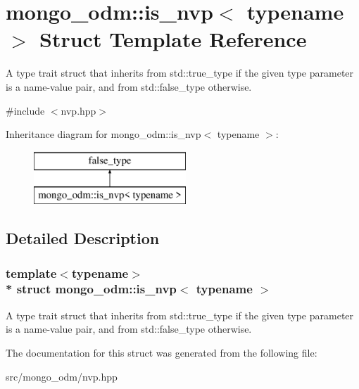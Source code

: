 \hypertarget{structmongo__odm_1_1is__nvp}{}\section{mongo\+\_\+odm\+:\+:is\+\_\+nvp$<$ typename $>$ Struct Template Reference}
\label{structmongo__odm_1_1is__nvp}


A type trait struct that inherits from std\+::true\+\_\+type if the given type parameter is a name-\/value pair, and from std\+::false\+\_\+type otherwise.  




{\ttfamily \#include $<$nvp.\+hpp$>$}

Inheritance diagram for mongo\+\_\+odm\+:\+:is\+\_\+nvp$<$ typename $>$\+:\begin{figure}[H]
\begin{center}
\leavevmode
\includegraphics[height=2.000000cm]{structmongo__odm_1_1is__nvp}
\end{center}
\end{figure}


\subsection{Detailed Description}
\subsubsection*{template$<$typename$>$\\*
struct mongo\+\_\+odm\+::is\+\_\+nvp$<$ typename $>$}

A type trait struct that inherits from std\+::true\+\_\+type if the given type parameter is a name-\/value pair, and from std\+::false\+\_\+type otherwise. 

The documentation for this struct was generated from the following file\+:\begin{DoxyCompactItemize}
\item 
src/mongo\+\_\+odm/nvp.\+hpp\end{DoxyCompactItemize}
